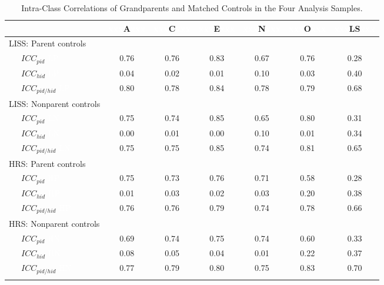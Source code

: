 \documentclass[
  english,
  man,floatsintext]{apa7}
\begin{document}
\begin{table}[h]

\begin{center}
\begin{threeparttable}

\caption{\label{tab:icc-table}Intra-Class Correlations of Grandparents and Matched Controls in the Four Analysis Samples.}

\begin{tabular}{lcccccc}
\toprule
 & \multicolumn{1}{c}{\textcolor{white}{xxx}A\textcolor{white}{xxx}} & \multicolumn{1}{c}{\textcolor{white}{xxx}C\textcolor{white}{xxx}} & \multicolumn{1}{c}{\textcolor{white}{xxx}E\textcolor{white}{xxx}} & \multicolumn{1}{c}{\textcolor{white}{xxx}N\textcolor{white}{xxx}} & \multicolumn{1}{c}{\textcolor{white}{xxx}O\textcolor{white}{xxx}} & \multicolumn{1}{c}{\textcolor{white}{xxx}LS\textcolor{white}{xxx}}\\
\midrule
LISS: Parent controls &  &  &  &  &  & \\
\ \ \ $ICC_{pid}$ \textcolor{white}{LP} & 0.76 & 0.76 & 0.83 & 0.67 & 0.76 & 0.28\\
\ \ \ $ICC_{hid}$ \textcolor{white}{LP} & 0.04 & 0.02 & 0.01 & 0.10 & 0.03 & 0.40\\
\ \ \ $ICC_{pid/hid}$ \textcolor{white}{LP} & 0.80 & 0.78 & 0.84 & 0.78 & 0.79 & 0.68\\
LISS: Nonparent controls &  &  &  &  &  & \\
\ \ \ $ICC_{pid}$ \textcolor{white}{LN} & 0.75 & 0.74 & 0.85 & 0.65 & 0.80 & 0.31\\
\ \ \ $ICC_{hid}$ \textcolor{white}{LN} & 0.00 & 0.01 & 0.00 & 0.10 & 0.01 & 0.34\\
\ \ \ $ICC_{pid/hid}$ \textcolor{white}{LN} & 0.75 & 0.75 & 0.85 & 0.74 & 0.81 & 0.65\\
HRS: Parent controls &  &  &  &  &  & \\
\ \ \ $ICC_{pid}$ \textcolor{white}{HP} & 0.75 & 0.73 & 0.76 & 0.71 & 0.58 & 0.28\\
\ \ \ $ICC_{hid}$ \textcolor{white}{HP} & 0.01 & 0.03 & 0.02 & 0.03 & 0.20 & 0.38\\
\ \ \ $ICC_{pid/hid}$ \textcolor{white}{HP} & 0.76 & 0.76 & 0.79 & 0.74 & 0.78 & 0.66\\
HRS: Nonparent controls &  &  &  &  &  & \\
\ \ \ $ICC_{pid}$ \textcolor{white}{HN} & 0.69 & 0.74 & 0.75 & 0.74 & 0.60 & 0.33\\
\ \ \ $ICC_{hid}$ \textcolor{white}{HN} & 0.08 & 0.05 & 0.04 & 0.01 & 0.22 & 0.37\\
\ \ \ $ICC_{pid/hid}$ \textcolor{white}{HN} & 0.77 & 0.79 & 0.80 & 0.75 & 0.83 & 0.70\\
\bottomrule
\addlinespace
\end{tabular}


\end{threeparttable}
\end{center}
\end{table}
\end{document}
